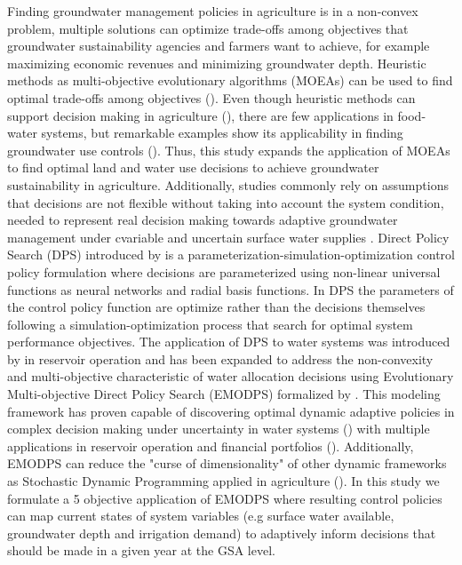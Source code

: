 \documentclass[11pt,a4paper]{article}
\begin{document}
Finding groundwater management policies in agriculture is in a non-convex problem, multiple solutions can optimize trade-offs among objectives that groundwater sustainability agencies and farmers want to achieve, for example maximizing economic revenues and minimizing groundwater depth. Heuristic methods as multi-objective evolutionary algorithms (MOEAs) can be used to find optimal trade-offs among objectives (\cite{coello_evolutionary_2007}). Even though heuristic methods can support decision making in agriculture (\cite{memmah_metaheuristics_2015}), there are few applications in food-water systems, but remarkable examples show its applicability in finding groundwater use controls (\cite{afshar_multi-objective_2020,salehi_shafa_multi-objective_2023,habibi_davijani_optimization_2016,mehrabi_assessment_2021,banihabib_development_2019}). Thus, this study expands the application of MOEAs to find optimal land and water use decisions to achieve groundwater sustainability in agriculture. Additionally, studies commonly rely on assumptions that decisions are not flexible without taking into account the system condition, needed to represent real decision making towards adaptive groundwater management under cvariable and uncertain surface water supplies \cite{}.  Direct Policy Search (DPS) introduced by \textcite{rosenstein_robot_2001} is a parameterization-simulation-optimization control policy formulation where decisions are parameterized using non-linear universal functions as neural networks and radial basis functions. In DPS the parameters of the control policy function are optimize rather than the decisions themselves following a simulation-optimization process that search for optimal system performance objectives. The application of DPS to water systems was introduced by \textcite{koutsoyiannis_evaluation_2003} in reservoir operation and has been expanded to address the non-convexity and multi-objective characteristic of water allocation decisions using Evolutionary Multi-objective Direct Policy Search (EMODPS) formalized by \textcite{giuliani_coupled_2016}. This modeling framework has proven capable of discovering optimal dynamic adaptive policies in complex decision making under uncertainty in water systems (\cite{macian-sorribes_inferring_2019}) with multiple applications in reservoir operation and financial portfolios (\cite{gupta_can_2020,zatarain_salazar_balancing_2017,hamilton_stream_2022}). Additionally, EMODPS can reduce the "curse of dimensionality" of other dynamic frameworks as Stochastic Dynamic Programming applied in agriculture (\cite{taylor_dynamic_1993}). In this study we formulate a 5 objective application of EMODPS where resulting control policies can map current states of system variables (e.g surface water available, groundwater depth and irrigation demand) to adaptively inform decisions that should be made in a given year at the GSA level. 
\end{document}
